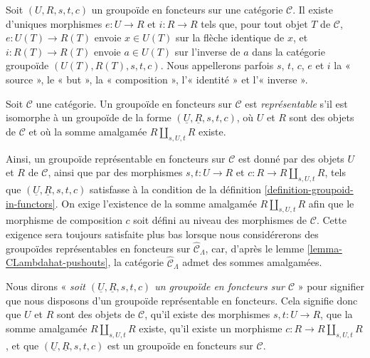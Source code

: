 \begin{remark}
\label{remark-identity-inverse}
Soit $(U, R, s, t, c)$ un groupoïde en foncteurs sur une catégorie
$\mathcal{C}$. Il existe d'uniques morphismes $e : U \to R$ et $i : R \to R$
tels que, pour tout objet $T$ de $\mathcal{C}$, $e: U(T) \to R(T)$ envoie
$x \in U(T)$ sur la flèche identique de $x$, et $i: R(T) \to R(T)$ envoie
$a \in U(T)$ sur l'inverse de $a$ dans la catégorie groupoïde
$(U(T), R(T), s, t, c)$. Nous appellerons parfois $s$, $t$, $c$, $e$ et $i$
la « source », le « but », la « composition », l'« identité » et l'« inverse ».
\end{remark}

\begin{definition}
\label{definition-representable}
Soit $\mathcal{C}$ une catégorie. Un groupoïde en foncteurs sur $\mathcal{C}$
est {\it représentable} s'il est isomorphe à un groupoïde de la forme
$(\underline{U}, \underline{R}, s, t, c)$, où $U$ et $R$ sont des objets de
$\mathcal{C}$ et où la somme amalgamée $R \amalg_{s, U, t} R$ existe.
\end{definition}

\begin{remark}
\label{remark-reason-existence-coproduct}
Ainsi, un groupoïde représentable en foncteurs sur $\mathcal{C}$ est donné par
des objets $U$ et $R$ de $\mathcal{C}$, ainsi que par des morphismes
$s, t : U \to R$ et $c : R \to R \amalg_{s, U, t} R$, tels que
$(\underline{U}, \underline{R}, s, t, c)$ satisfasse à la condition de la
définition \ref{definition-groupoid-in-functors}. On exige l'existence de la
somme amalgamée $R \amalg_{s, U, t} R$ afin que le morphisme de composition
$c$ soit défini au niveau des morphismes de $\mathcal{C}$. Cette exigence sera
toujours satisfaite plus bas lorsque nous considérerons des groupoïdes
représentables en foncteurs sur $\widehat{\mathcal{C}}_\Lambda$, car, d'après
le lemme \ref{lemma-CLambdahat-pushouts}, la catégorie
$\widehat{\mathcal{C}}_\Lambda$ admet des sommes amalgamées.
\end{remark}

\begin{remark}
\label{remark-simplify-terminology}
Nous dirons « {\it soit $(\underline{U}, \underline{R}, s, t, c)$ un
groupoïde en foncteurs sur $\mathcal{C}$} » pour signifier que nous disposons
d'un groupoïde représentable en foncteurs. Cela signifie donc que $U$ et $R$
sont des objets de $\mathcal{C}$, qu'il existe des morphismes
$s, t : U \to R$, que la somme amalgamée $R \amalg_{s, U, t} R$ existe, qu'il
existe un morphisme $c : R \to R \amalg_{s, U, t} R$, et que
$(\underline{U}, \underline{R}, s, t, c)$ est un groupoïde en foncteurs sur
$\mathcal{C}$.
\end{remark}

